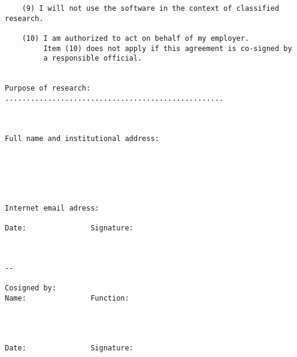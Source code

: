 \begin{verbatim}
	(9) I will not use the software in the context of classified research.

	(10) I am authorized to act on behalf of my employer.
	     Item (10) does not apply if this agreement is co-signed by
	     a responsible official.

 
Purpose of research: ...................................................



Full name and institutional address:






Internet email adress: 

Date:				Signature:



--

Cosigned by:
Name:				Function:
				



Date:   			Signature:             


\end{verbatim}


